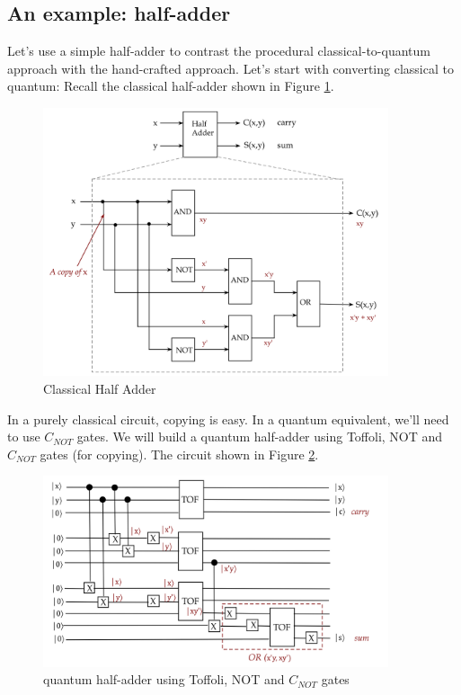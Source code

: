 \documentclass[main.tex]{subfiles}
\begin{document}
\subsection{An example: half-adder}

    Let's use a simple half-adder to contrast the procedural classical-to-quantum approach with the hand-crafted approach. Let's start with converting classical to quantum: Recall the classical half-adder shown in Figure \ref{fig:23adder1}.
    
    \begin{figure}
        \centering
        \includegraphics[width=4in]{notes/figs/n10/23adder1.png}
        \caption{Classical Half Adder}
        \label{fig:23adder1}
    \end{figure}
    
    In a purely classical circuit, copying is easy. In a quantum equivalent, we'll need to use $C_{NOT}$ gates. We will build a quantum half-adder using Toffoli, NOT and $C_{NOT}$ gates (for copying). The circuit shown in Figure \ref{fig:24adder2}.
    
    \begin{figure}
        \centering
        \includegraphics[width=4in]{notes/figs/n10/24adder2.png}
        \caption{quantum half-adder using Toffoli, NOT and $C_{NOT}$ gates}
        \label{fig:24adder2}
    \end{figure}
    
\end{document}
